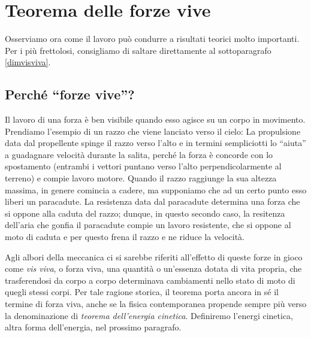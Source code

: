 






\section{Teorema delle forze vive}
Osserviamo ora come il lavoro può condurre a risultati teorici
molto importanti. Per i più frettolosi, consigliamo di saltare
direttamente al sottoparagrafo \ref{dimvisviva}.

\subsection{Perché ``forze vive''?}
Il lavoro di una forza è ben visibile quando esso agisce su un corpo
in movimento. Prendiamo l'esempio di un razzo che viene lanciato verso
il cielo: La propulsione data dal
propellente spinge il razzo verso l'alto e in termini sempliciotti lo
``aiuta'' a guadagnare velocità durante la salita, perché la forza è
concorde con lo spostamento (entrambi i vettori puntano verso l'alto
perpendicolarmente al terreno) e compie lavoro motore. Quando il razzo raggiunge la sua altezza
massima, in genere comincia a cadere, ma supponiamo che ad un certo
punto esso liberi un paracadute. La resistenza data dal paracadute
determina una forza che si oppone alla caduta del razzo; dunque, in
questo secondo caso, la resitenza dell'aria che gonfia il paracadute
compie un lavoro resistente, che si oppone al moto di caduta e per questo
frena il razzo e ne riduce la velocità.

Agli albori della meccanica ci si sarebbe riferiti all'effetto di queste
forze in gioco come \textit{vis viva}, o forza viva, una quantità o
un'essenza dotata di vita propria,
che trasferendosi da corpo a corpo determinava cambiamenti nello stato
di moto di quegli stessi corpi. Per tale ragione storica, il teorema
porta ancora in sé il termine di forza viva, anche se la fisica
contemporanea propende sempre più verso la denominazione di
\textit{teorema dell'energia cinetica}. Definiremo l'energi cinetica,
altra forma dell'energia, nel prossimo paragrafo.

